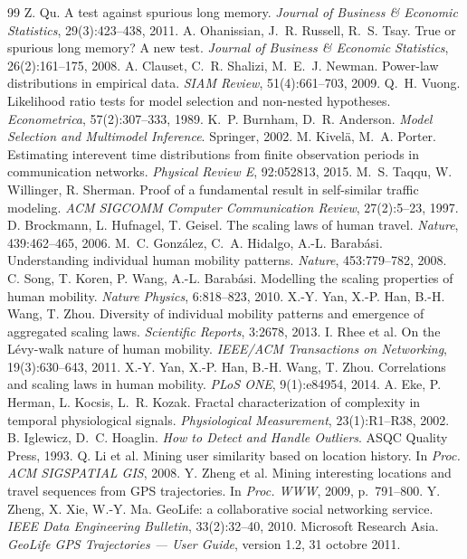 \documentclass[11pt,a4paper]{article}
\renewcommand{\_}{\textunderscore\penalty0\hspace{0pt}}
\begin{document}
\begin{thebibliography}{99}
 Z. Qu. A test against spurious long memory. \textit{Journal of Business \& Economic Statistics}, 29(3):423--438, 2011.
 A. Ohanissian, J.~R. Russell, R.~S. Tsay. True or spurious long memory? A new test. \textit{Journal of Business \& Economic Statistics}, 26(2):161--175, 2008.
 A. Clauset, C.~R. Shalizi, M.~E.~J. Newman. Power-law distributions in empirical data. \textit{SIAM Review}, 51(4):661--703, 2009.
 Q.~H. Vuong. Likelihood ratio tests for model selection and non-nested hypotheses. \textit{Econometrica}, 57(2):307--333, 1989.
 K.~P. Burnham, D.~R. Anderson. \textit{Model Selection and Multimodel Inference}. Springer, 2002.
 M. Kivelä, M.~A. Porter. Estimating interevent time distributions from finite observation periods in communication networks. \textit{Physical Review E}, 92:052813, 2015.
 M.~S. Taqqu, W. Willinger, R. Sherman. Proof of a fundamental result in self-similar traffic modeling. \textit{ACM SIGCOMM Computer Communication Review}, 27(2):5--23, 1997.
 D. Brockmann, L. Hufnagel, T. Geisel. The scaling laws of human travel. \textit{Nature}, 439:462--465, 2006.
 M.~C. González, C.~A. Hidalgo, A.-L. Barabási. Understanding individual human mobility patterns. \textit{Nature}, 453:779--782, 2008.
 C. Song, T. Koren, P. Wang, A.-L. Barabási. Modelling the scaling properties of human mobility. \textit{Nature Physics}, 6:818--823, 2010.
 X.-Y. Yan, X.-P. Han, B.-H. Wang, T. Zhou. Diversity of individual mobility patterns and emergence of aggregated scaling laws. \textit{Scientific Reports}, 3:2678, 2013.
 I. Rhee et al. On the Lévy-walk nature of human mobility. \textit{IEEE/ACM Transactions on Networking}, 19(3):630--643, 2011.
 X.-Y. Yan, X.-P. Han, B.-H. Wang, T. Zhou. Correlations and scaling laws in human mobility. \textit{PLoS ONE}, 9(1):e84954, 2014.
 A. Eke, P. Herman, L. Kocsis, L.~R. Kozak. Fractal characterization of complexity in temporal physiological signals. \textit{Physiological Measurement}, 23(1):R1--R38, 2002.
 B. Iglewicz, D.~C. Hoaglin. \textit{How to Detect and Handle Outliers}. ASQC Quality Press, 1993.
 Q. Li et al. Mining user similarity based on location history. In \textit{Proc. ACM SIGSPATIAL GIS}, 2008.
 Y. Zheng et al. Mining interesting locations and travel sequences from GPS trajectories. In \textit{Proc. WWW}, 2009, p.~791--800.
 Y. Zheng, X. Xie, W.-Y. Ma. GeoLife: a collaborative social networking service. \textit{IEEE Data Engineering Bulletin}, 33(2):32--40, 2010.
 Microsoft Research Asia. \textit{GeoLife GPS Trajectories --- User Guide}, version 1.2, 31 octobre 2011.

\end{thebibliography}
\end{document}
